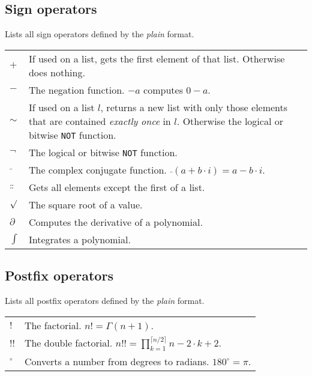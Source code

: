 \documentclass[10pt]{article}
\begin{document}
    \subsection{Sign operators}
    Lists all sign operators defined by the \textit{plain} format.
    \begin{longtable}{p{}p{}}
        $ + $                   & If used on a list, gets the first element of that list.
                                  Otherwise does nothing. \\
        $ - $                   & The negation function. $ -a $ computes $ 0 - a $. \\
        $ \sim $                & If used on a list $ l $, returns a new list with only those elements that are contained \textsl{exactly once} in $ l $.
                                  Otherwise the logical or bitwise \texttt{NOT} function. \\
        $ \neg $                & The logical or bitwise \texttt{NOT} function. \\
        $ \bar{\;} $            & The complex conjugate function. $ \bar{\;}(a + b \cdot i) = a - b \cdot i $. \\
        $ \dblcolon $           & Gets all elements except the first of a list. \\
        $ \sqrt{\vphantom{0}} $ & The square root of a value. \\
        $ \partial $            & Computes the derivative of a polynomial. \\
        $ \int $                & Integrates a polynomial. \\
    \end{longtable}
    
    \subsection{Postfix operators}
    Lists all postfix operators defined by the \textit{plain} format.
    \begin{longtable}{p{}p{}}
        $ ! $      & The factorial. $ n! = \Gamma(n + 1) $. \\
        $ !! $     & The double factorial. $ n!! = \prod\limits_{k=1}^{\lceil n/2 \rceil} n -2 \cdot k + 2 $. \\
        $ ^\circ $ & Converts a number from degrees to radians. $ 180^\circ = \pi $.
    \end{longtable}
    
\end{document}
